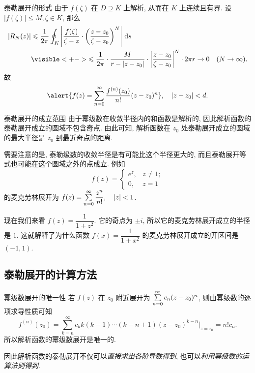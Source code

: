\begin{frame}{泰勒展开的形式}
	\onslide<+->
	由于 $f(\zeta)$ 在 $D\supseteq K$ 上解析, 从而在 $K$ 上连续且有界.
	\onslide<+->
	设 $|f(\zeta)|\le M,\zeta\in K$,
	\onslide<+->
	那么
	\begin{align*}
		|R_N(z)|&\le\frac 1{2\pi}\oint_K\abs{\frac{f(\zeta)}{\zeta-z}\cdot\left(\frac{z-z_0}{\zeta-z_0}\right)^N}\diff s\\
		&\visible<+->{\le\frac 1{2\pi}\cdot \frac M{r-|z-z_0|}\cdot\abs{\frac{z-z_0}{\zeta-z_0}}^N\cdot 2\pi r\to 0\quad (N\to\infty).}
	\end{align*}
	\onslide<+->
	故
	\[\alert{f(z)=\sum_{n=0}^\infty\frac{f^{(n)}(z_0)}{n!}(z-z_0)^n},\quad |z-z_0|<d.\]
\end{frame}


\begin{frame}{泰勒展开的成立范围}
	\onslide<+->
	由于幂级数在收敛半径内的和函数是解析的, 因此解析函数的泰勒展开成立的圆域不包含奇点.
	\onslide<+->
	由此可知, 解析函数在 $z_0$ 处\alert{泰勒展开成立的圆域的最大半径是 $z_0$ 到最近奇点的距离}.

	\onslide<+->
	需要注意的是, 泰勒级数的收敛半径是有可能比这个半径更大的,
	\onslide<+->
	而且泰勒展开等式也可能在这个圆域之外的点成立.
	\onslide<+->
	例如 
	\[f(z)=\begin{cases}
	e^z,&z\neq 1;\\ 0,&z=1
	\end{cases}\]
	的麦克劳林展开为 $f(z)=\sum\limits_{n=0}^\infty \dfrac{z^n}{n!},\quad |z|<1$.

	\onslide<+->
	现在我们来看 $f(z)=\dfrac1{1+z^2}$.
	\onslide<+->
	它的奇点为 $\pm i$, 所以它的麦克劳林展开成立的半径是 $1$.
	\onslide<+->
	这就解释了为什么函数 $f(x)=\dfrac1{1+x^2}$ 的麦克劳林展开成立的开区间是 $(-1,1)$.
\end{frame}


\subsection{泰勒展开的计算方法}
\begin{frame}{幂级数展开的唯一性}
	\onslide<+->
	若 $f(z)$ 在 $z_0$ 附近展开为 $\sum\limits_{n=0}^\infty c_n(z-z_0)^n$,
	\onslide<+->
	则由幂级数的逐项求导性质可知
	\[f^{(n)}(z_0)=\sum_{k=n}^\infty c_k k(k-1)\cdots(k-n+1)(z-z_0)^{k-n}\Big|_{z=z_0}=n!c_n.\]
	\onslide<+->
	所以\alert{解析函数的幂级数展开是唯一的}.

	\onslide<+->
	因此解析函数的泰勒展开不仅可以\emph{直接求出各阶导数得到}, 也可以\emph{利用幂级数的运算法则得到}.
\end{frame}


